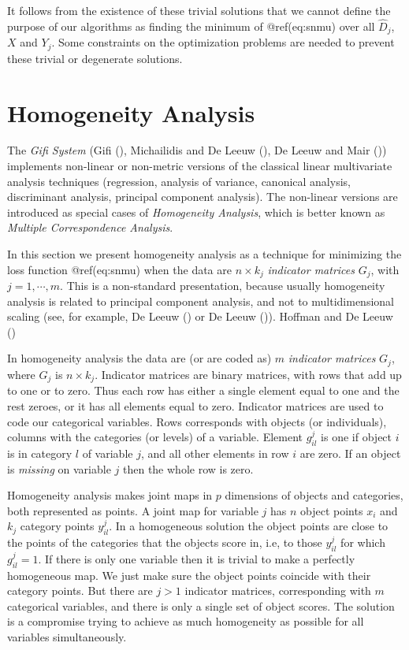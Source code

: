 \documentclass[
  12pt,
  letterpaper,
  DIV=11,
  numbers=noendperiod]{scrartcl}
\begin{document}
It follows from the existence of these trivial solutions that we cannot
define the purpose of our algorithms as finding the minimum of
@ref(eq:snmu) over all \(\hat D_j\), \(X\) and \(Y_j\). Some constraints
on the optimization problems are needed to prevent these trivial or
degenerate solutions.

\section{Homogeneity Analysis}\label{hom}

The \emph{Gifi System} (Gifi (),
Michailidis and De Leeuw
(), De Leeuw and Mair
()) implements non-linear or
non-metric versions of the classical linear multivariate analysis
techniques (regression, analysis of variance, canonical analysis,
discriminant analysis, principal component analysis). The non-linear
versions are introduced as special cases of \emph{Homogeneity Analysis},
which is better known as \emph{Multiple Correspondence Analysis}.

In this section we present homogeneity analysis as a technique for
minimizing the loss function @ref(eq:snmu) when the data are
\(n\times k_j\) \emph{indicator matrices} \(G_j\), with
\(j=1,\cdots,m\). This is a non-standard presentation, because usually
homogeneity analysis is related to principal component analysis, and not
to multidimensional scaling (see, for example, De Leeuw
() or De Leeuw
()). Hoffman and De Leeuw
()

In homogeneity analysis the data are (or are coded as) \(m\)
\emph{indicator matrices} \(G_j\), where \(G_j\) is \(n\times k_j\).
Indicator matrices are binary matrices, with rows that add up to one or
to zero. Thus each row has either a single element equal to one and the
rest zeroes, or it has all elements equal to zero. Indicator matrices
are used to code our categorical variables. Rows corresponds with
objects (or individuals), columns with the categories (or levels) of a
variable. Element \(g_{il}^j\) is one if object \(i\) is in category
\(l\) of variable \(j\), and all other elements in row \(i\) are zero.
If an object is \emph{missing} on variable \(j\) then the whole row is
zero.

Homogeneity analysis makes joint maps in \(p\) dimensions of objects and
categories, both represented as points. A joint map for variable \(j\)
has \(n\) object points \(x_i\) and \(k_j\) category points
\(y^j_{il}\). In a homogeneous solution the object points are close to
the points of the categories that the objects score in, i.e, to those
\(y^j_{il}\) for which \(g^j_{il}=1\). If there is only one variable
then it is trivial to make a perfectly homogeneous map. We just make
sure the object points coincide with their category points. But there
are \(j>1\) indicator matrices, corresponding with \(m\) categorical
variables, and there is only a single set of object scores. The solution
is a compromise trying to achieve as much homogeneity as possible for
all variables simultaneously.
\end{document}
